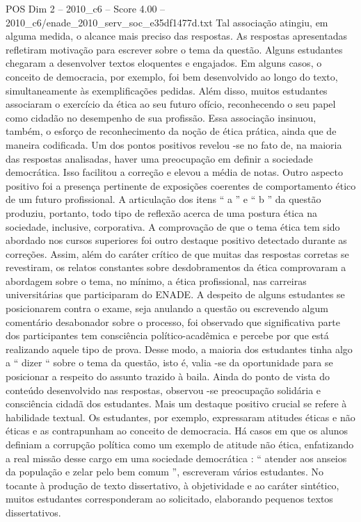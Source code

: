 \begin{textsample}{POS Dim 2 – 2010\_c6 – Score 4.00 – 2010\_c6/enade\_2010\_serv\_soc\_e35df1477d.txt}
Tal associação atingiu, em alguma medida, o alcance mais preciso das respostas.
As respostas apresentadas refletiram motivação para escrever sobre o tema da questão.
Alguns estudantes chegaram a desenvolver textos eloquentes e engajados.
Em alguns casos, o conceito de democracia, por exemplo, foi bem desenvolvido ao longo do texto, simultaneamente às exemplificações pedidas.
Além disso, muitos estudantes associaram o exercício da ética ao seu futuro ofício, reconhecendo o seu papel como cidadão no desempenho de sua profissão.
Essa associação insinuou, também, o esforço de reconhecimento da noção de ética prática, ainda que de maneira codificada.
Um dos pontos positivos revelou -se no fato de, na maioria das respostas analisadas, haver uma preocupação em definir a sociedade democrática.
Isso facilitou a correção e elevou a média de notas.
Outro aspecto positivo foi a presença pertinente de exposições coerentes de comportamento ético de um futuro profissional.
A articulação dos itens “ a ” e “ b ” da questão produziu, portanto, todo tipo de reflexão acerca de uma postura ética na sociedade, inclusive, corporativa.
A comprovação de que o tema ética tem sido abordado nos cursos superiores foi outro destaque positivo detectado durante as correções.
Assim, além do caráter crítico de que muitas das respostas corretas se revestiram, os relatos constantes sobre desdobramentos da ética comprovaram a abordagem sobre o tema, no mínimo, a ética profissional, nas carreiras universitárias que participaram do ENADE.
A despeito de alguns estudantes se posicionarem contra o exame, seja anulando a questão ou escrevendo algum comentário desabonador sobre o processo, foi observado que significativa parte dos participantes tem consciência político-acadêmica e percebe por que está realizando aquele tipo de prova.
Desse modo, a maioria dos estudantes tinha algo a “ dizer “ sobre o tema da questão, isto é, valia -se da oportunidade para se posicionar a respeito do assunto trazido à baila.
Ainda do ponto de vista do conteúdo desenvolvido nas respostas, observou -se preocupação solidária e consciência cidadã dos estudantes.
Mais um destaque positivo crucial se refere à habilidade textual.
Os estudantes, por exemplo, expressaram atitudes éticas e não éticas e as contrapunham ao conceito de democracia.
Há casos em que os alunos definiam a corrupção política como um exemplo de atitude não ética, enfatizando a real missão desse cargo em uma sociedade democrática : “ atender aos anseios da população e zelar pelo bem comum ”, escreveram vários estudantes.
No tocante à produção de texto dissertativo, à objetividade e ao caráter sintético, muitos estudantes corresponderam ao solicitado, elaborando pequenos textos dissertativos.

\end{textsample}
